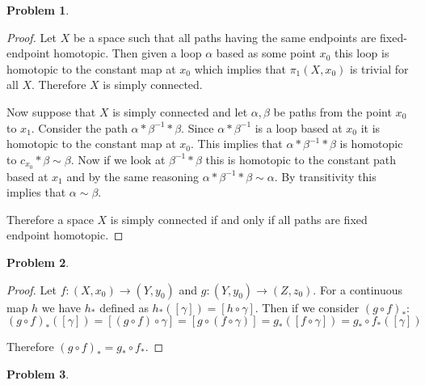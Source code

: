 \documentclass[10pt]{article}
\newcommand{\sk}{\vskip 10mm}
\theoremstyle{plain}
\newtheorem{problem}{Problem}
\theoremstyle{remark}
\begin{document}
\begin{problem}
  
\end{problem} %

\begin{proof}
  Let $X$ be a space such that all paths having the same endpoints are fixed-endpoint
  homotopic. Then given a loop $\alpha$ based as some point $x_0$ this loop is homotopic
  to the constant map at $x_0$ which implies that $\pi_1(X,x_0)$ is trivial for all
  $X$. Therefore $X$ is simply connected.

  Now suppose that $X$ is simply connected and let $\alpha,\beta$ be paths from the point $x_0$
  to $x_1$. Consider the path $\alpha*\beta^{-1}*\beta$. Since $\alpha*\beta^{-1}$ is a loop based at $x_0$
  it is homotopic to the constant map at $x_0$. This implies that
  $\alpha*\beta^{-1}*\beta$ is homotopic to $c_{x_0}*\beta\sim \beta$. Now if we look at $\beta^{-1}*\beta$ this is
  homotopic to the constant path based at $x_1$ and by the same reasoning
  $\alpha*\beta^{-1}*\beta\sim \alpha$. By transitivity this implies that $\alpha\sim \beta$.

  Therefore a space $X$ is simply connected if and only if all paths are fixed
  endpoint homotopic.
\end{proof}

\sk

\begin{problem} %
  
\end{problem}

\begin{proof}
  Let $f:(X,x_0)\rightarrow (Y,y_0)$ and $g:(Y,y_0)\rightarrow (Z,z_0)$. For a continuous map
  $h$ we have $h_*$ defined as $h_*([\gamma])=[h\circ \gamma]$. Then if we consider
  $(g\circ f)_*$:
  \[ (g\circ f)_*([\gamma]) = [(g\circ f)\circ \gamma] = [g\circ (f\circ \gamma)] = g_*([f\circ \gamma])=g_*\circ f_*([\gamma])\]

  Therefore $(g\circ f)_*=g_*\circ f_*$.
\end{proof}

\sk

\begin{problem} %
  
\end{problem}
\end{document}
